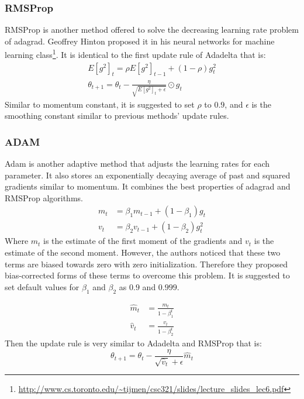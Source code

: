\documentclass[a4paper, nobind]{templates/ociamthesis}
\begin{document}
\hypertarget{rmsprop}{%
\subsubsection{RMSProp}\label{rmsprop}}

\noindent RMSProp is another method offered to solve the decreasing learning rate problem of adagrad. Geoffrey Hinton proposed it in his neural networks for machine learning class\footnote{\url{http://www.cs.toronto.edu/~tijmen/csc321/slides/lecture_slides_lec6.pdf}}. It is identical to the first update rule of Adadelta that is:
\[
\begin{aligned}
E\left[g^{2}\right]_{t}=\rho E\left[g^{2}\right]_{t-1}+(1-\rho) g_{t}^{2} \\
\theta_{t+1}=\theta_{t}-\frac{\eta}{\sqrt{E\left[g^{2}\right]_{t}+\epsilon}} \odot g_{t}
\end{aligned}
\]
Similar to momentum constant, it is suggested to set \(\rho\) to \(0.9\), and \(\epsilon\) is the smoothing constant similar to previous methods' update rules.

\hypertarget{adam}{%
\subsubsection{ADAM}\label{adam}}

\noindent Adam is another adaptive method that adjusts the learning rates for each parameter. It also stores an exponentially decaying average of past and squared gradients similar to momentum. It combines the best properties of adagrad and RMSProp algorithms.
\[
\begin{aligned}
m_{t} &=\beta_{1} m_{t-1}+\left(1-\beta_{1}\right) g_{t} \\
v_{t} &=\beta_{2} v_{t-1}+\left(1-\beta_{2}\right) g_{t}^{2}
\end{aligned}
\]
Where \(m_t\) is the estimate of the first moment of the gradients and \(v_t\) is the estimate of the second moment. However, the authors noticed that these two terms are biased towards zero with zero initialization. Therefore they proposed bias-corrected forms of these terms to overcome this problem. It is suggested to set default values for \(\beta_1\) and \(\beta_2\) as \(0.9\) and \(0.999\).

\[
\begin{aligned}
\hat{m}_{t} &=\frac{m_{t}}{1-\beta_{1}^{t}} \\
\hat{v}_{t} &=\frac{v_{t}}{1-\beta_{2}^{t}}
\end{aligned}
\]
Then the update rule is very similar to Adadelta and RMSProp that is:
\[
\theta_{t+1}=\theta_{t}-\frac{\eta}{\sqrt{\hat{v}_{t}}+\epsilon} \hat{m}_{t}
\]
\end{document}
